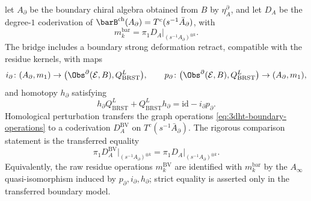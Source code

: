 let \(A_\partial\) be the boundary chiral algebra obtained from \(B\)
by \(\eta_A^\partial\), and let \(D_A\) be the degree-\(1\)
coderivation of
\(\barB^{\mathrm{ch}}(A_\partial)=T^c(s^{-1}\bar A_\partial)\), with
\[
 m_k^{\mathrm{bar}}
 =
 \pi_1D_A\big|_{(s^{-1}A_\partial)^{\otimes k}} .
\]
The bridge includes a boundary strong deformation retract, compatible
with the residue kernels, with maps
\[
 i_\partial\colon (A_\partial,m_1)\to
 \bigl(\Obs^\partial(\mathcal E,B),Q_{\mathrm{BRST}}^L\bigr),
 \qquad
 p_\partial\colon
 \bigl(\Obs^\partial(\mathcal E,B),Q_{\mathrm{BRST}}^L\bigr)
 \to (A_\partial,m_1),
\]
and homotopy \(h_\partial\) satisfying
\[
 h_\partial Q_{\mathrm{BRST}}^L+Q_{\mathrm{BRST}}^Lh_\partial
 =\mathrm{id}-i_\partial p_\partial .
\]
Homological perturbation transfers the graph operations
\eqref{eq:3dht-boundary-operations} to a coderivation
\(D_A^{\mathrm{BV}}\) on \(T^c(s^{-1}\bar A_\partial)\).  The rigorous
comparison statement is the transferred equality
\begin{equation}\label{eq:3dht-bv-bar-transfer-comparison}
 \pi_1D_A^{\mathrm{BV}}\big|_{(s^{-1}A_\partial)^{\otimes k}}
 =
 \pi_1D_A\big|_{(s^{-1}A_\partial)^{\otimes k}} .
\end{equation}
Equivalently, the raw residue operations \(m_k^{\mathrm{BV}}\) are
identified with \(m_k^{\mathrm{bar}}\) by the \(A_\infty\)
quasi-isomorphism induced by \(p_\partial,i_\partial,h_\partial\);
strict equality is asserted only in the transferred boundary model.


